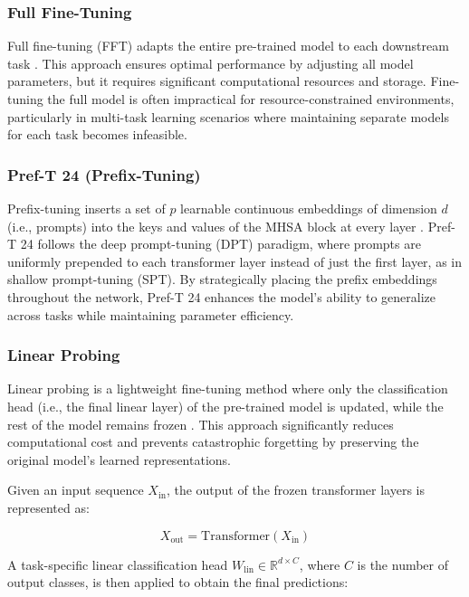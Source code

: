 \documentclass[11pt]{article}
\begin{document}
\subsubsection{Full Fine-Tuning}
Full fine-tuning (FFT) adapts the entire pre-trained model to each downstream task \cite{xu2023parameter}. This approach ensures optimal performance by adjusting all model parameters, but it requires significant computational resources and storage. Fine-tuning the full model is often impractical for resource-constrained environments, particularly in multi-task learning scenarios where maintaining separate models for each task becomes infeasible.

\subsubsection{Pref-T 24 (Prefix-Tuning)}
Prefix-tuning inserts a set of $p$ learnable continuous embeddings of dimension $d$ (i.e., prompts) into the keys and values of the MHSA block at every layer \cite{li2021prefix}. Pref-T 24 follows the deep prompt-tuning (DPT) paradigm, where prompts are uniformly prepended to each transformer layer instead of just the first layer, as in shallow prompt-tuning (SPT). By strategically placing the prefix embeddings throughout the network, Pref-T 24 enhances the model’s ability to generalize across tasks while maintaining parameter efficiency.

\subsubsection{Linear Probing}
Linear probing is a lightweight fine-tuning method where only the classification head (i.e., the final linear layer) of the pre-trained model is updated, while the rest of the model remains frozen \cite{kumar2022finetuning}. This approach significantly reduces computational cost and prevents catastrophic forgetting by preserving the original model’s learned representations.

Given an input sequence $X_{\text{in}}$, the output of the frozen transformer layers is represented as:

\begin{equation}
X_{\text{out}} = \text{Transformer}(X_{\text{in}})
\end{equation}

A task-specific linear classification head $W_{\text{lin}} \in \mathbb{R}^{d \times C}$, where $C$ is the number of output classes, is then applied to obtain the final predictions:
\end{document}
